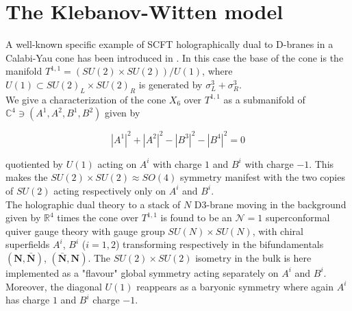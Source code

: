 \section{The Klebanov-Witten model}

A well-known specific example of SCFT holographically dual to D-branes in a Calabi-Yau cone has been introduced in \cite{KW_SCFT}. In this case the base of the cone is the manifold $T^{1,1} = (SU(2)\times SU(2))/U(1)$, where $U(1) \subset SU(2)_L\times SU(2)_R$ is generated by $\sigma^3_L + \sigma^3_R$.\\

We give a characterization of the cone $X_6$ over $T^{1,1}$ as a submanifold of $\mathbb{C}^4 \ni (A^1,A^2,B^1,B^2)$ given by

\begin{equation}
	|A^1|^2 + |A^2|^2 - |B^3|^2 - |B^4|^2 = 0
\end{equation}

quotiented by $U(1)$ acting on $A^i$ with charge $1$ and $B^i$ with charge $-1$. This makes the $SU(2)\times SU(2) \approx SO(4)$ symmetry manifest with the two copies of $SU(2)$ acting respectively only on $A^i$ and $B^i$.\\


The holographic dual theory to a stack of $N$ D3-brane moving in the background given by $\mathbb{R}^4$ times the cone over $T^{1,1}$ is found to be an $\mathcal{N}=1$ superconformal quiver gauge theory with gauge group $SU(N)\times SU(N)$, with chiral superfields $A^i$, $B^i$ ($i=1,2$) transforming respectively in the bifundamentals $(\mathbf{N},\mathbf{\bar N})$, $(\mathbf{\bar N},\mathbf{N})$. The $SU(2)\times SU(2)$ isometry in the bulk is here implemented as a "flavour" global symmetry acting separately on $A^i$ and $B^i$. Moreover, the diagonal $U(1)$ reappears as a baryonic symmetry where again $A^i$ has charge $1$ and $B^i$ charge $-1$.\\



